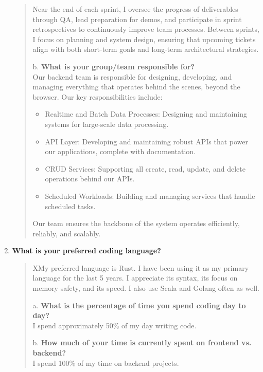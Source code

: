 \begin{cvparagraph}
\begin{enumerate}
\begin{quote}
          Near the end of each sprint, I oversee the progress of deliverables through QA, lead preparation for demos, and participate in sprint retrospectives to continuously improve team processes.
          Between sprints, I focus on planning and system design, ensuring that upcoming tickets align with both short-term goals and long-term architectural strategies.

          b. \textbf{What is your group/team responsible for?} \\
          Our backend team is responsible for designing, developing, and managing everything that operates behind the scenes, beyond the browser.
          Our key responsibilities include:

            \begin{itemize}
                \item Realtime and Batch Data Processes: Designing and maintaining systems for large-scale data processing.
                \item API Layer: Developing and maintaining robust APIs that power our applications, complete with documentation.
                \item CRUD Services: Supporting all create, read, update, and delete operations behind our APIs.
                \item Scheduled Workloads: Building and managing services that handle scheduled tasks.
            \end{itemize}
          Our team ensures the backbone of the system operates efficiently, reliably, and scalably.

      \end{quote}
      \item \textbf{What is your preferred coding language?} \\
      \begin{quote}
          XMy preferred language is Rust.
          I have been using it as my primary language for the last 5 years.
          I appreciate its syntax, its focus on memory safety, and its speed.
          I also use Scala and Golang often as well.

          a. \textbf{What is the percentage of time you spend coding day to day?} \\
          I spend approximately 50\% of my day writing code.

          b. \textbf{How much of your time is currently spent on frontend vs. backend?} \\
          I spend 100\% of my time on backend projects.


\end{quote}
\end{enumerate}
\end{cvparagraph}
